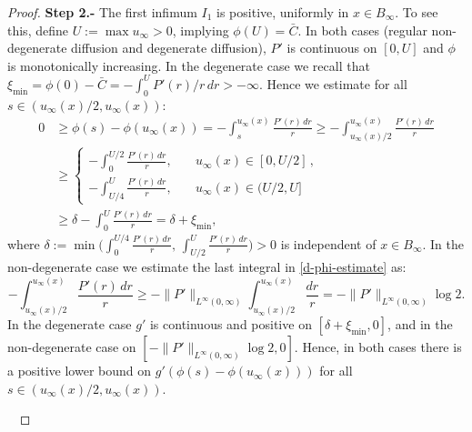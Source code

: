 \documentclass[reqno]{amsart}
\newcommand{\uinf}{u_\infty}
\begin{document}
\begin{proof}
{\bf Step 2.-} The first infimum $I_1$ is positive, uniformly in $x\in B_\infty$. To see this, define $U:=\max u_\infty>0$, implying $\phi(U)=\bar C$. In both cases (regular non-degenerate diffusion and degenerate diffusion), $P'$ is continuous on $[0,U]$ and $\phi$ is monotonically increasing.    
In the degenerate case we recall that $\xi_{\min}=\phi(0)-\bar C=-\int_0^U P'(r)/r\,dr>-\infty$.
Hence we estimate for all $s\in(\uinf(x)/2,\uinf(x))$: 
\begin{align}\label{d-phi-estimate}
        0 &\ge \phi(s) - \phi(\uinf(x)) = - \int_s^{\uinf(x)}\frac{P'(r)\,dr}r 
        \ge - \int_{\uinf(x)/2}^{\uinf(x)}\frac{P'(r)\,dr}{r} \\
    &\ge
    \begin{cases}
        - \int_{0}^{U/2}\frac{P'(r)\,dr}{r}, \quad & u_\infty(x)\in[0,U/2]\,,\\
        - \int_{U/4}^{U}\frac{P'(r)\,dr}{r}, \quad & u_\infty(x)\in(U/2,U]
    \end{cases}  \nonumber \\
    &\ge \delta - \int_0^U \frac{P'(r)\,dr}{r}  = \delta+\xi_{\min} , \nonumber 
\end{align}
where $\delta:=\min\Big(\int_{0}^{U/4}\frac{P'(r)\,dr}{r},\,\int_{U/2}^{U}\frac{P'(r)\,dr}{r}\Big)>0$ is independent of $x\in B_\infty$. 
In the non-degenerate case we estimate the last integral in \eqref{d-phi-estimate} as:
$$
  - \int_{\uinf(x)/2}^{\uinf(x)}\frac{P'(r)\,dr}{r} 
        \ge -\|P'\|_{L^\infty(0,\infty)} \int_{\uinf(x)/2}^{\uinf(x)}\frac{dr}{r} =-\|P'\|_{L^\infty(0,\infty)} \log 2.
$$
In the degenerate case $g'$ is continuous and positive on $[\delta+\xi_{\min},0]$, and in the non-degenerate case on $[-\|P'\|_{L^\infty(0,\infty)} \log 2,0]$. Hence, in both cases there is a positive lower bound on $g'(\phi(s)-\phi(\uinf(x)))$ for all $s\in(\uinf(x)/2,\uinf(x))$. 

\


\end{proof}
\end{document}
